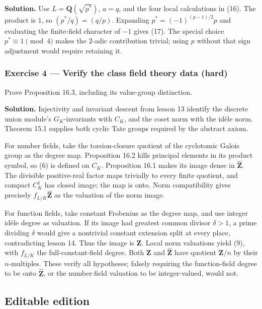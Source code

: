 \documentclass[11pt,a4paper]{article}
\begin{document}
\textbf{Solution.} Use \(L=\mathbf Q(\sqrt{p^*})\), \(a=q\), and the
four local calculations in (16). The product is \(1\), so
\((p^*/q)=(q/p)\). Expanding \(p^*=(-1)^{(p-1)/2}p\) and evaluating the
finite-field character of \(-1\) gives (17). The special choice
\(p^*\equiv1\pmod4\) makes the \(2\)-adic contribution trivial; using
\(p\) without that sign adjustment would require retaining it.

\subsubsection{Exercise 4 --- Verify the class field theory data
(hard)}\label{exercise-4-verify-the-class-field-theory-data-hard}

Prove Proposition 16.3, including its value-group distinction.

\textbf{Solution.} Injectivity and invariant descent from lesson 13
identify the discrete union module's \(G_K\)-invariants with \(C_K\),
and the coset norm with the idèle norm. Theorem 15.1 supplies both
cyclic Tate groups required by the abstract axiom.

For number fields, take the torsion-closure quotient of the cyclotomic
Galois group as the degree map. Proposition 16.2 kills principal
elements in its product symbol, so (6) is defined on \(C_K\).
Proposition 16.1 makes its image dense in \(\widehat{\mathbf Z}\). The
divisible positive-real factor maps trivially to every finite quotient,
and compact \(C_K^1\) has closed image; the map is onto. Norm
compatibility gives precisely \(f_{L/K}\widehat{\mathbf Z}\) as the
valuation of the norm image.

For function fields, take constant Frobenius as the degree map, and use
integer idèle degree as valuation. If its image had greatest common
divisor \(\delta>1\), a prime dividing \(\delta\) would give a
nontrivial constant extension split at every place, contradicting lesson
14. Thus the image is \(\mathbf Z\). Local norm valuations yield (9),
with \(f_{L/K}\) the full-constant-field degree. Both \(\mathbf Z\) and
\(\widehat{\mathbf Z}\) have quotient \(\mathbf Z/n\) by their
\(n\)-multiples. These verify all hypotheses; falsely requiring the
function-field degree to be onto \(\widehat{\mathbf Z}\), or the
number-field valuation to be integer-valued, would not.

\subsection{Editable edition}\label{editable-edition}
\end{document}

